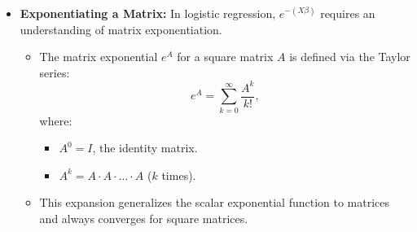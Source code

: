 \documentclass[10pt]{article}
\begin{document}
\begin{itemize}
    \item \textbf{Exponentiating a Matrix:} In logistic regression, \(e^{-(X\beta)}\) requires an understanding of matrix exponentiation.
    \begin{itemize}
        \item The matrix exponential \(e^A\) for a square matrix \(A\) is defined via the Taylor series:
        \[
        e^A = \sum_{k=0}^{\infty} \frac{A^k}{k!},
        \]
        where:
        \begin{itemize}
            \item \(A^0 = I\), the identity matrix.
            \item \(A^k = A \cdot A \cdot \ldots \cdot A\) (\(k\) times).
        \end{itemize}
        \item This expansion generalizes the scalar exponential function to matrices and always converges for square matrices.
    \end{itemize}
\end{itemize}
\end{document}
